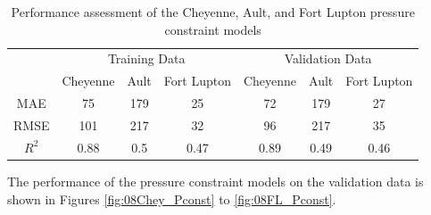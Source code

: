 \begin{table}[h]
    \centering
    {
    \begin{tabular}{c|c|c|c|c|c|c|}
    \multicolumn{1}{l|}{} & \multicolumn{3}{c|}{Training Data} & \multicolumn{3}{c|}{Validation Data} \\ \cline{2-7} 
    \multicolumn{1}{l|}{} & Cheyenne   & Ault   & Fort Lupton  & Cheyenne    & Ault   & Fort Lupton   \\ \hline
    MAE                   & 75         & 179    & 25           & 72          & 179    & 27            \\
    RMSE                  & 101        & 217    & 32           & 96          & 217    & 35            \\
    $R^2$                 & 0.88       & 0.5    & 0.47         & 0.89        & 0.49   & 0.46         
    \end{tabular}}
    \caption{Performance assessment of the Cheyenne, Ault, and Fort Lupton pressure constraint models}
    \label{tab:08pres_const_performance}
\end{table}

The performance of the pressure constraint models on the validation data is shown in Figures \ref{fig:08Chey_Pconst} to \ref{fig:08FL_Pconst}.

